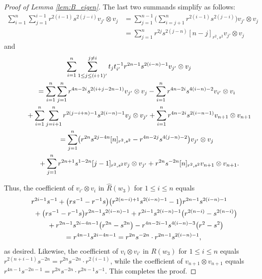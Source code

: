 \documentclass[pdftex]{sigma}
\numberwithin{equation}{section}
\begin{document}
\begin{proof}[Proof of Lemma \ref{lem:B_eigen}]
The last two summands simplify as follows:
\begin{align*}
 \sum_{i = 1}^{n}\sum_{j = 1}^{i - 1} r^{2(i - 1)}s^{2(j - i)} v_{j'} \otimes v_{j} &{}=
 \sum_{j = 1}^{n-1} \Biggl( \sum_{i = j + 1}^{n}r^{2(i - 1)}s^{2(j - i)} \Biggr) v_{j'}\otimes v_{j}\\
 &{} =
 \sum_{j = 1}^{n}r^{2j}s^{2(j - n)}[n-j]_{r^{2},s^{2}}v_{j'} \otimes v_{j}
\end{align*}
and
\begin{gather*}
 \sum_{i = 1}^{n}\sum_{1\leq j\leq (i + 1)'}^{j \neq i} t_{j}t_{i'}^{-1}r^{2n - 1}s^{2(i - n) - 1}v_{j'} \otimes v_{j} \\
 \qquad{}= \sum_{i = 1}^{n}\sum_{j = 1}^{n} r^{4n - 2i}s^{2(i + j - 2n - 1)}v_{j'} \otimes v_{j} -
 \sum_{i = 1}^{n} r^{4n - 2i}s^{4(i - n) - 2} v_{i'} \otimes v_{i} \\
 \qquad\hphantom{=}{} + \sum_{i = 1}^{n}\sum_{j = i + 1}^{n} r^{2(j - i + n) - 1}s^{2(i - n) - 1}v_{j} \otimes v_{j'}
 + \sum_{i = 1}^{n} r^{4n -2i}s^{2(i - n - 1)} v_{n + 1} \otimes v_{n + 1} \\
 \qquad{} = \sum_{j = 1}^{n}\bigl(r^{2n}s^{2j - 4n}[n]_{r^{2},s^{2}} - r^{4n - 2j}s^{4(j - n) - 2}\bigr) v_{j'} \otimes v_{j} \\
 \qquad\hphantom{=}{} + \sum_{j = 1}^{n} r^{2n + 1}s^{1 - 2n}[j - 1]_{r^{2},s^{2}} v_{j} \otimes v_{j'}+ r^{2n}s^{-2n}[n]_{r^{2},s^{2}}v_{n + 1} \otimes v_{n + 1}.
\end{gather*}


Thus, the coefficient of $v_{i'} \otimes v_{i}$ in $\hat{R}(w_3)$ for $1\leq i\leq n$ equals
\begin{gather*}
 r^{2i - 1}s^{-1} +
 \bigl(rs^{-1} - r^{-1}s\bigr)\bigl(r^{2(n - i) + 1}s^{2(i - n) - 1} - 1\bigr)r^{2n - 1}s^{2(i-n) - 1}\\
 \quad\hphantom{=}{} + \bigl(rs^{-1} - r^{-1}s\bigr)r^{2n - 1}s^{2(i - n) - 1}+r^{2i - 1}s^{2(i - n) - 1}\bigl(r^{2(n - i)} - s^{2(n - i)}\bigr) \\
 \quad\hphantom{=}{} + r^{2n - 1}s^{2i - 4n - 1}\bigl(r^{2n} - s^{2n}\bigr) - r^{4n - 2i - 1}s^{4(i - n) - 3}\bigl(r^{2} - s^{2}\bigr) \\
 \quad{} = r^{4n - 1}s^{2i - 4n - 1} = r^{2n}s^{-2n}\cdot r^{2n - 1}s^{2(i - n) - 1},
\end{gather*}
as desired.
Likewise, the coefficient of $v_{i} \otimes v_{i'}$ in $\hat{R}(w_3)$ for $1\leq i\leq n$ equals $r^{2(n + i - 1)}s^{-2n} = r^{2n}s^{-2n}\cdot r^{2(i - 1)}$, while the coefficient of $v_{n+ 1} \otimes v_{n+1}$ equals $r^{4n - 1}s^{-2n - 1} = r^{2n}s^{-2n}\cdot r^{2n - 1}s^{-1}$. This completes the proof.
\end{proof}
\end{document}
